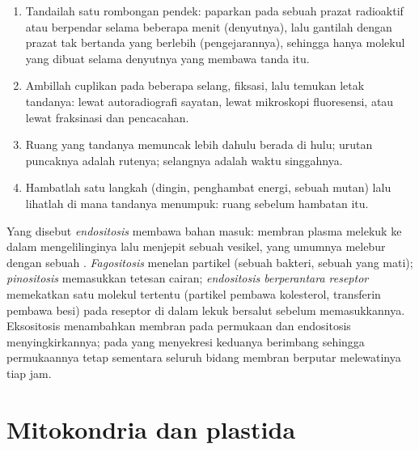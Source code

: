 \begin{method}\label{met:b1:eukaryotic-cell:pulsechase}
\begin{enumerate}
  \item Tandailah satu rombongan pendek: paparkan  pada sebuah
        prazat radioaktif atau berpendar selama beberapa menit
        (denyutnya), lalu gantilah dengan prazat tak bertanda yang
        berlebih (pengejarannya), sehingga hanya molekul yang dibuat
        selama denyutnya yang membawa tanda itu.
  \item Ambillah cuplikan pada beberapa selang, fiksasi, lalu temukan
        letak tandanya: lewat autoradiografi sayatan, lewat mikroskopi
        fluoresensi, atau lewat fraksinasi dan pencacahan.
  \item Ruang yang tandanya memuncak lebih dahulu berada di hulu;
        urutan puncaknya adalah rutenya; selangnya adalah waktu
        singgahnya.
  \item Hambatlah satu langkah (dingin, penghambat energi, sebuah
        mutan) lalu lihatlah di mana tandanya menumpuk: ruang sebelum
        hambatan itu.
\end{enumerate}
\end{method}

\begin{definition}[Endositosis]\label{def:b1:eukaryotic-cell:endocytosis}
Yang disebut \emph{endositosis} membawa bahan masuk:
membran plasma melekuk ke dalam mengelilinginya lalu menjepit sebuah
vesikel, yang umumnya melebur dengan sebuah .
\emph{Fagositosis} menelan partikel (sebuah bakteri, sebuah  yang
mati); \emph{pinositosis} memasukkan tetesan cairan; \emph{endositosis
berperantara reseptor} memekatkan satu molekul tertentu (partikel
pembawa kolesterol, transferin pembawa besi) pada reseptor di dalam
lekuk bersalut sebelum memasukkannya. Eksositosis menambahkan membran
pada permukaan  dan endositosis menyingkirkannya; pada  yang
menyekresi keduanya berimbang sehingga permukaannya tetap sementara
seluruh bidang membran berputar melewatinya tiap jam.
\end{definition}

\section{Mitokondria dan plastida}

